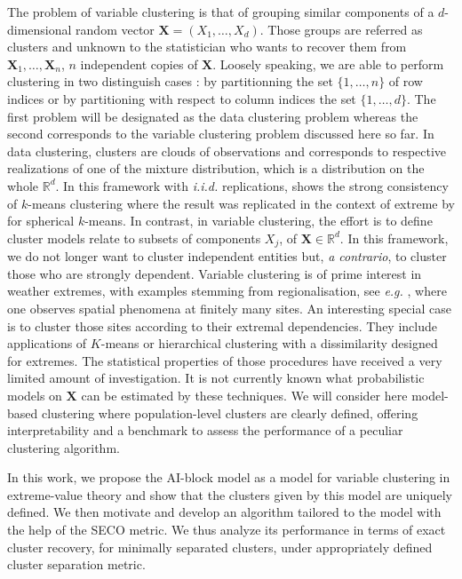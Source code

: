 \documentclass[11pt]{article}
\begin{document}
	The problem of variable clustering is that of grouping similar components of a $d$-dimensional random vector $\textbf{X} = (X_1,\dots,X_d)$. Those groups are referred as clusters and unknown to the statistician who wants to recover them from $\textbf{X}_1, \dots, \textbf{X}_n$, $n$ independent copies of $\textbf{X}$. Loosely speaking, we are able to perform clustering in two distinguish cases : by partitionning the set $\{1,\dots, n\}$ of row indices or by partitioning with respect to column indices the set $\{1,\dots,d\}$. The first problem will be designated as the data clustering problem whereas the second corresponds to the variable clustering problem discussed here so far. In data clustering, clusters are clouds of observations and corresponds to respective realizations of one of the mixture distribution, which is a distribution on the whole $\mathbb{R}^d$. In this framework with \emph{i.i.d.} replications, \cite{pollard1981strong} shows the strong consistency of $k$-means clustering where the result was replicated in the context of extreme by \cite{janssen2020k} for spherical $k$-means. In contrast, in variable clustering, the effort is to define cluster models relate to subsets of components $X_j$, of $\textbf{X} \in \mathbb{R}^d$. In this framework, we do not longer want to cluster independent entities but, \emph{a contrario}, to cluster those who are strongly dependent. Variable clustering is of prime interest in weather extremes, with examples stemming from regionalisation, see \emph{e.g.} \cite{bernard2013clustering,bador2015spatial, saunders2021regionalisation}, where one observes spatial phenomena at finitely many sites. An interesting special case is to cluster those sites according to their extremal dependencies. They include applications of $K$-means or hierarchical clustering with a dissimilarity designed for extremes. The statistical properties of those procedures have received a very limited amount of investigation. It is not currently known what probabilistic models on $\textbf{X}$ can be estimated by these techniques. We will consider here model-based clustering where population-level clusters are clearly defined, offering interpretability and a benchmark to assess the performance of a peculiar clustering algorithm.
	
	In this work, we propose the AI-block model as a model for variable clustering in extreme-value theory and show that the clusters given by this model are uniquely defined. We then motivate and develop an algorithm tailored to the model with the help of the SECO metric. We thus analyze its performance in terms of exact cluster recovery, for minimally separated clusters, under appropriately defined cluster separation metric.
	
\end{document}
